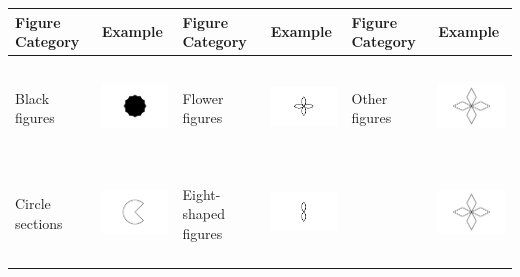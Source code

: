 \begin{table}
\centering
\begin{tabular}[t]{l>{}ll>{}ll>{}l}
\toprule
Figure Category & Example & Figure Category & Example & Figure Category & Example\\
\midrule
Black figures & \includegraphics[width=1in, height=1in]{black-figures.png} & Flower figures & \includegraphics[width=1in, height=1in]{flowers.png} & Other figures & \includegraphics[width=1in, height=1in]{other-figures.png}\\
Circle sections & \includegraphics[width=1in, height=1in]{circle-sections.png} & Eight-shaped figures & \includegraphics[width=1in, height=1in]{eight-shapes-figures.png} &  & \includegraphics[width=1in, height=1in]{other-figures.png}\\

\end{tabular}
\end{table}
